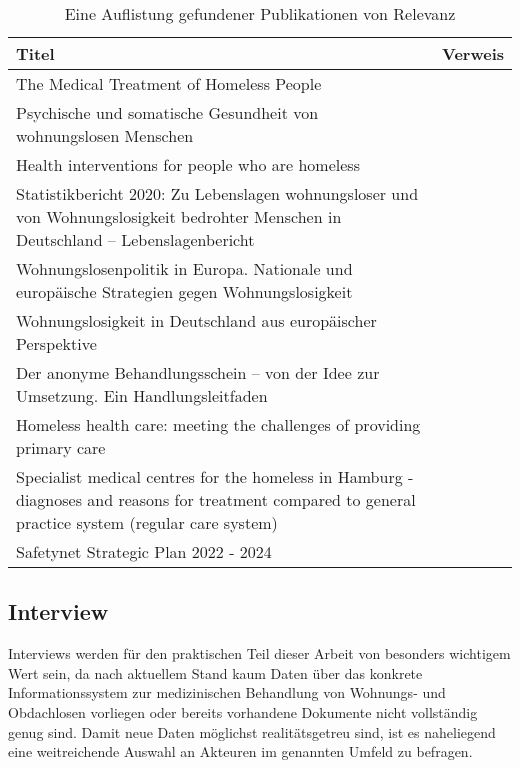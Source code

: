 \begin{table}[ht]
	\centering
	\textwidth
	\begin{tabulary}{\textwidth}{LL}
		\toprule
		Titel							&	Verweis\\
		\midrule
		The Medical Treatment of Homeless People&
		\citet{Kaduszkiewicz.2017}\\
		Psychische und somatische Gesundheit von wohnungslosen Menschen&
		\citet{DAE228829}\\
		Health interventions for people who are homeless&
		\citet{Hwang.2014}\\
		Statistikbericht 2020: Zu Lebenslagen wohnungsloser und von Wohnungslosigkeit bedrohter Menschen in Deutschland -- Lebenslagenbericht&
		\citet{BAGW.2022}\\
		Wohnungslosenpolitik in Europa. Nationale und europäische Strategien gegen Wohnungslosigkeit&
		\citet{Busch-Geertsema.2012}\\
		Wohnungslosigkeit in Deutschland aus europäischer Perspektive&
		\citet{Busch-Geertsema.2018}\\
		Der anonyme Behandlungsschein -- von der Idee zur Umsetzung. Ein Handlungsleitfaden & \citet{Zanders.2022}\\
		Homeless health care: meeting the challenges of providing primary care &	\citet{Davies.2018}\\
		Specialist medical centres for the homeless in Hamburg - diagnoses and reasons for treatment compared to general practice system (regular care system)&
		\citet{Leeden.2023}\\
		Safetynet Strategic Plan 2022 - 2024&
		\citet{Safetynet.2022}\\
		\bottomrule
	\end{tabulary}
	\caption[Relevante Publikationen]{Eine Auflistung gefundener Publikationen von Relevanz}
	\label{tab:pub}
\end{table}

\subsection{Interview}

Interviews werden für den praktischen Teil dieser Arbeit von besonders wichtigem Wert sein, da nach aktuellem Stand kaum Daten über das konkrete Informationssystem zur medizinischen Behandlung von Wohnungs- und Obdachlosen vorliegen oder bereits vorhandene Dokumente nicht vollständig genug sind. Damit neue Daten möglichst realitätsgetreu sind, ist es naheliegend eine weitreichende Auswahl an Akteuren im genannten Umfeld zu befragen.

